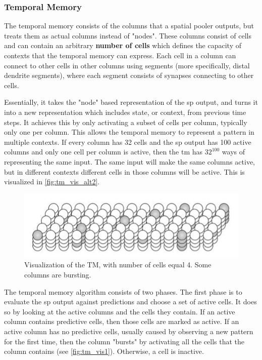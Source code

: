 \subsubsection{Temporal Memory}
\label{sec:temporal_memory}
The temporal memory consists of the columns that a spatial pooler outputs, but treats them as actual columns instead of "nodes". These columns consist of cells and can contain an arbitrary \textbf{number of cells} which defines the capacity of contexts that the temporal memory can express. Each cell in a column can connect to other cells in other columns using segments (more specifically, distal dendrite segments), where each segment consists of synapses connecting to other cells.
\par
Essentially, it takes the "node" based representation of the \gls*{sp} output, and turns it into a new representation which includes state, or context, from previous time steps. It achieves this by only activating a subset of cells per column, typically only one per column. This allows the temporal memory to represent a pattern in multiple contexts. If every column has 32 cells and the \gls*{sp} output has 100 active columns and only one cell per column is active, then the \gls*{tm} has $32^{100}$ ways of representing the same input. The same input will make the same columns active, but in different contexts different cells in those columns will be active. This is visualized in \autoref{fig:tm_vis_alt2}.
\begin{figure}[H]
    \centering
    \includegraphics[width=\linewidth]{resources/related_works/tm_vis_alt2}
    \caption[Temporal Memory Visualization]{Visualization of the TM, with number of cells equal 4. Some columns are bursting.}
    \label{fig:tm_vis_alt2}
\end{figure}
\par
The temporal memory algorithm consists of two phases. The first phase is to evaluate the \gls*{sp} output against predictions and choose a set of active cells. It does so by looking at the active columns and the cells they contain. If an active column contains predictive cells, then those cells are marked as active. If an active column has no predictive cells, usually caused by observing a new pattern for the first time, then the column "bursts" by activating all the cells that the column contains (see \autoref{fig:tm_vis1}). Otherwise, a cell is inactive.
